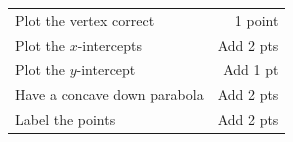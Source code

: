 {
	\begin{tabular}{l r}
	Plot the vertex correct&1 point\\
	Plot the $x$-intercepts& Add 2 pts\\
	Plot the $y$-intercept & Add 1 pt\\
	Have a concave down parabola&Add 2 pts\\
	Label the points&Add 2 pts
	\end{tabular}
}